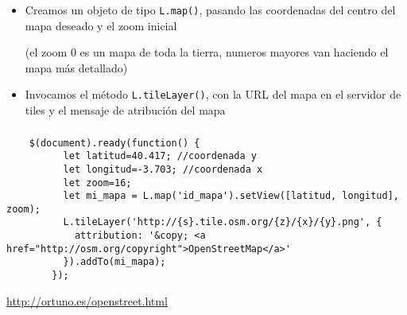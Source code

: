 \documentclass[ucs]{beamer}
\begin{document}
\begin{frame}[fragile]
\frametitle{}
\begin{itemize}
\item
Creamos un objeto de tipo 
\verb|L.map()|, pasando las coordenadas del centro
del mapa deseado y el zoom inicial 

(el zoom 0 es un mapa de toda la tierra, numeros mayores van
haciendo el mapa más detallado)

\item

Invocamos el método \verb|L.tileLayer()|, 
con la URL del mapa en el servidor de tiles
y el mensaje de atribución del mapa
\end{itemize}
\end{frame}



\begin{frame}[fragile]
\frametitle{}

  \begin{scriptsize}
  \begin{verbatim}
    $(document).ready(function() {
          let latitud=40.417; //coordenada y
          let longitud=-3.703; //coordenada x
          let zoom=16;
          let mi_mapa = L.map('id_mapa').setView([latitud, longitud], zoom);
          L.tileLayer('http://{s}.tile.osm.org/{z}/{x}/{y}.png', {
            attribution: '&copy; <a href="http://osm.org/copyright">OpenStreetMap</a>'
          }).addTo(mi_mapa);
        });
  \end{verbatim}
  \end{scriptsize}


\begin{tiny}
\begin{flushright}
\url{http://ortuno.es/openstreet.html}
\end{flushright}
\end{tiny}
\end{frame}
\end{document}
